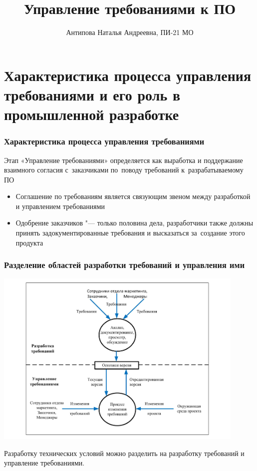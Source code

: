 \documentclass{../industrial-development}
\title{Управление требованиями к ПО}
\author{Антипова Наталья Андреевна, ПИ-21 МО}
\date{}
\begin{document}
\begin{frame}
  \titlepage
\end{frame}



\section{Характеристика процесса управления требованиями и его роль в промышленной разработке}
\begin{frame} \frametitle{Характеристика процесса управления требованиями}
  \begin{block}{}
	Этап \alert{«Управление требованиями»} определяется как выработка и поддержание взаимного согласия с~заказчиками по~поводу требований к~разрабатываемому ПО
  \end{block}
 	 \begin{itemize}
\item Соглашение по требованиям является связующим звеном между разработкой и управлением требованиями
\item Одобрение заказчиков "--- только половина дела, разработчики также должны принять задокументированные требования и высказаться за~создание этого продукта
  	\end{itemize}
\end{frame}



\begin{frame} \frametitle{Разделение областей разработки требований и управления ими}
 \centerline{\includegraphics[width=0.9\textwidth]{pic1.pdf}}
\end{frame}

\lecturenotes

Разработку технических условий можно разделить на разработку требований и управление требованиями. 
\end{document}
